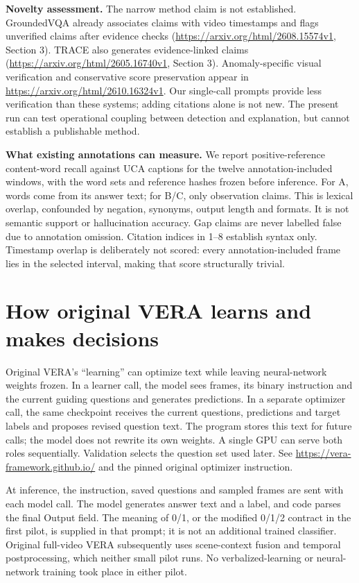 \textbf{Novelty assessment.} The narrow method claim is not established. GroundedVQA already associates claims with video timestamps and flags unverified claims after evidence checks (\url{https://arxiv.org/html/2608.15574v1}, Section 3). TRACE also generates evidence-linked claims (\url{https://arxiv.org/html/2605.16740v1}, Section 3). Anomaly-specific visual verification and conservative score preservation appear in \url{https://arxiv.org/html/2610.16324v1}. Our single-call prompts provide less verification than these systems; adding citations alone is not new. The present run can test operational coupling between detection and explanation, but cannot establish a publishable method.

\textbf{What existing annotations can measure.} We report positive-reference content-word recall against UCA captions for the twelve annotation-included windows, with the word sets and reference hashes frozen before inference. For A, words come from its answer text; for B/C, only observation claims. This is lexical overlap, confounded by negation, synonyms, output length and formats. It is not semantic support or hallucination accuracy. Gap claims are never labelled false due to annotation omission. Citation indices in 1--8 establish syntax only. Timestamp overlap is deliberately not scored: every annotation-included frame lies in the selected interval, making that score structurally trivial.

\section{How original VERA learns and makes decisions}
Original VERA's ``learning'' can optimize text while leaving neural-network weights frozen. In a learner call, the model sees frames, its binary instruction and the current guiding questions and generates predictions. In a separate optimizer call, the same checkpoint receives the current questions, predictions and target labels and proposes revised question text. The program stores this text for future calls; the model does not rewrite its own weights. A single GPU can serve both roles sequentially. Validation selects the question set used later. See \url{https://vera-framework.github.io/} and the pinned original optimizer instruction.

At inference, the instruction, saved questions and sampled frames are sent with each model call. The model generates answer text and a label, and code parses the final Output field. The meaning of 0/1, or the modified 0/1/2 contract in the first pilot, is supplied in that prompt; it is not an additional trained classifier. Original full-video VERA subsequently uses scene-context fusion and temporal postprocessing, which neither small pilot runs. No verbalized-learning or neural-network training took place in either pilot.

